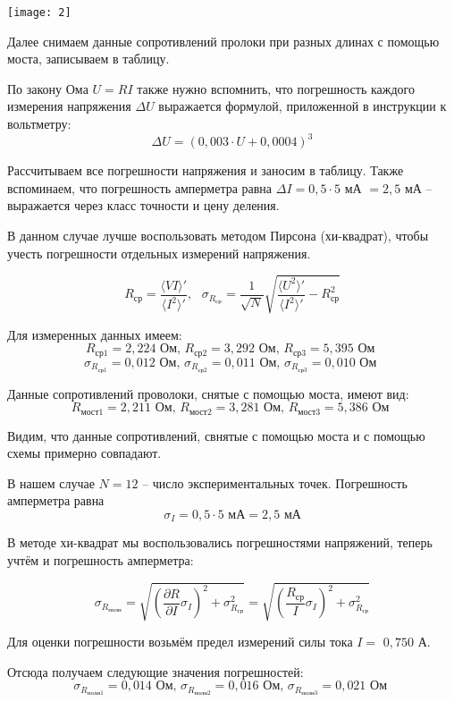 \documentclass[a4paper, 12pt]{article} %
\begin{document}
\begin{center}
	{\texttt{[image: 2]}}
\end{center}

Далее снимаем данные сопротивлений пролоки при разных длинах с помощью моста, записываем в таблицу.

По закону Ома $U=RI$ также нужно вспомнить, что погрешность каждого измерения напряжения $\Delta U$ выражается формулой, приложенной в инструкции к вольтметру:
\[\Delta U = (0,003\cdot U + 0,0004)^{3}\]

Рассчитываем все погрешности напряжения и заносим в таблицу. Также вспоминаем, что погрешность амперметра равна $\Delta I = 0,5 \cdot 5$ мА $= 2,5$ мА -- выражается через класс точности и цену деления.

В данном случае лучше воспользовать методом Пирсона (хи-квадрат), чтобы учесть погрешности отдельных измерений напряжения. 

\[R_{\text{ср}} = \frac{\langle VI \rangle '}{\langle I^2 \rangle '}, \text{ } \sigma_{R_{\text{ср}}} = \frac{1}{\sqrt{N}} \sqrt{\frac{\langle U^2 \rangle '}{\langle I^2 \rangle '} - R^2_{\text{ср}}}\]

Для измеренных данных имеем:
\[R_{\text{ср}1} = 2,224 \text{ Ом, }R_{\text{ср}2} = 3,292\text{ Ом, }R_{\text{ср}3} = 5,395\text{ Ом }\]
\[\sigma_{R_{\text{ср}1}} = 0,012 \text{ Ом, }\sigma_{R_{\text{ср}2}} = 0,011\text{ Ом, }\sigma_{R_{\text{ср}3}} = 0,010\text{ Ом }\]

Данные сопротивлений проволоки, снятые с помощью моста, имеют вид:
\[R_{\text{мост}1} = 2,211 \text{ Ом, }R_{\text{мост}2} = 3,281\text{ Ом, }R_{\text{мост}3} = 5,386\text{ Ом }\]

Видим, что данные сопротивлений, свнятые с помощью моста и с помощью схемы примерно совпадают.

В нашем случае $N = 12$ -- число экспериментальных точек. Погрешность амперметра равна
\[\sigma_I = 0,5 \cdot 5 \text{ мА} = 2,5 \text{ мА}\]

В методе хи-квадрат мы воспользовались погрешностями напряжений, теперь учтём и погрешность амперметра:

\[\sigma_{R_{\text{полн}}} = \sqrt{ \left(\frac{\partial R}{\partial I} \sigma_I\right)^2 + \sigma_{R_{\text{ср}}}^2} = \sqrt{ \left(\frac{R_{\text{ср}}}{I} \sigma_I\right)^2 + \sigma_{R_{\text{ср}}}^2}\]

Для оценки погрешности возьмём предел измерений силы тока $I =$ $0,750$ А.

Отсюда получаем следующие значения погрешностей:
\[\sigma_{R_{\text{полн}1}} = 0,014 \text{ Ом, }\sigma_{R_{\text{полн}2}} = 0,016\text{ Ом, }\sigma_{R_{\text{полн}3}} = 0,021\text{ Ом }\]
\end{document}
